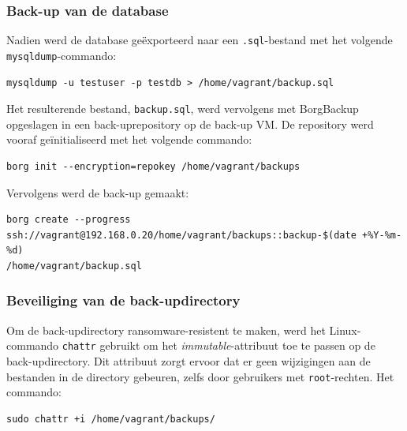 \subsubsection{Back-up van de database}
Nadien werd de database geëxporteerd naar een \texttt{.sql}-bestand met het volgende \texttt{mysqldump}-commando:
\begin{lstlisting}[language=script, caption={mysqldump commando om een databank te exporteren}]
mysqldump -u testuser -p testdb > /home/vagrant/backup.sql
\end{lstlisting}
Het resulterende bestand, \texttt{backup.sql}, werd vervolgens met BorgBackup opgeslagen in een back-uprepository op de back-up VM. De repository werd vooraf geïnitialiseerd met het volgende commando:
\begin{lstlisting}[language=script, caption={Borg commando om een map te initialiseren als Borg repository}]
borg init --encryption=repokey /home/vagrant/backups
\end{lstlisting}
Vervolgens werd de back-up gemaakt:
\begin{lstlisting}[language=script, caption={Borg commando om een back-up te nemen}]
borg create --progress 
ssh://vagrant@192.168.0.20/home/vagrant/backups::backup-$(date +%Y-%m-%d) 
/home/vagrant/backup.sql
\end{lstlisting}

\subsubsection{Beveiliging van de back-updirectory}
Om de back-updirectory ransomware-resistent te maken, werd het Linux-commando \texttt{chattr} gebruikt om het \textit{immutable}-attribuut toe te passen op de back-updirectory. Dit attribuut zorgt ervoor dat er geen wijzigingen aan de bestanden in de directory gebeuren, zelfs door gebruikers met \texttt{root}-rechten. Het commando:
\begin{lstlisting}[language=script, caption={Linux commando om de map immutable te maken}]
sudo chattr +i /home/vagrant/backups/
\end{lstlisting}

